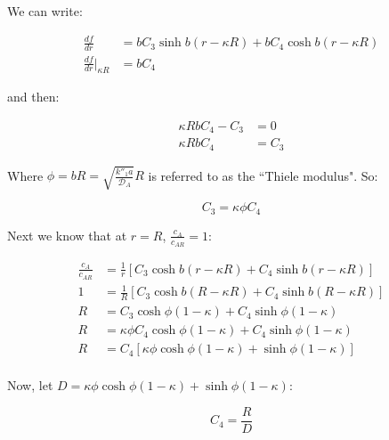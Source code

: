 \documentclass[letterpaper,12pt]{article}
\begin{document}
We can write:

\begin{equation}
\begin{aligned}
    \frac{df}{dr}                   &= bC_3 \sinh{b(r - \kappa R)} + bC_4 \cosh{b(r - \kappa R)} \\
    \frac{df}{dr} \bigg|_{\kappa R} &= b C_4
\end{aligned}
\end{equation}

and then:

\begin{equation}
\begin{aligned}
    \kappa R b C_4 - C_3 &= 0 \\
    \kappa R b C_4       &= C_3 
\end{aligned}
\end{equation}

Where $\phi = bR = \sqrt{\frac{k''_1 a}{\mathcal{D}_A}} R$ is referred to as the ``Thiele modulus". So:

\begin{equation}
    C_3 = \kappa \phi C_4
\end{equation}

Next we know that at $r = R$, $\frac{c_A}{c_{AR}} = 1$:

\begin{equation}
\begin{aligned}
    \frac{c_A}{c_{AR}} &= \frac{1}{r} \left[ C_3 \cosh{b(r - \kappa R)} + C_4 \sinh{b(r - \kappa R)} \right] \\
    1                  &= \frac{1}{R} \left[ C_3 \cosh{b(R - \kappa R)} + C_4 \sinh{b(R - \kappa R)} \right] \\
    R                  &= C_3 \cosh{\phi(1 - \kappa)} + C_4 \sinh{\phi(1 - \kappa)} \\
    R                  &=  \kappa \phi C_4 \cosh{\phi(1 - \kappa)} + C_4 \sinh{\phi(1 - \kappa)} \\
    R                  &=  C_4 \left[\kappa \phi \cosh{\phi(1 - \kappa)} + \sinh{\phi(1 - \kappa)} \right]\\
\end{aligned}
\end{equation} 

Now, let $D = \kappa \phi \cosh{\phi(1 - \kappa)} + \sinh{\phi(1 - \kappa)}$:

\begin{equation}
    C_4 = \frac{R}{D}
\end{equation}
\end{document}
